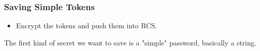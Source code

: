 \begin{frame}
	\frametitle{Saving Simple Tokens}
	\begin{itemize}
		\item Encrypt the tokens and push them into RCS.
	\end{itemize}
    \note[item]The first kind of secret we want to save is a "simple" password, basically a string.
\end{frame}
